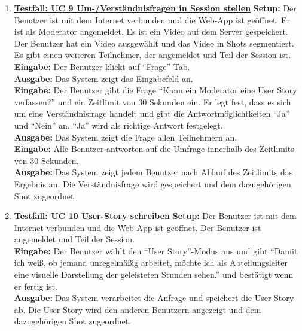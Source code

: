 \begin{enumerate}
	\item \underline{\textbf{Testfall: UC 9 Um-/Verständnisfragen in Session stellen}} \linebreak
	\textbf{Setup:} Der Benutzer ist mit dem Internet verbunden und die Web-App ist geöffnet. Er ist als Moderator angemeldet. Es ist ein Video auf dem Server gespeichert. Der Benutzer hat ein Video ausgewählt und das Video in Shots segmentiert. Es gibt einen weiteren Teilnehmer, der angemeldet und Teil der Session ist.\\
	\textbf{Eingabe:} Der Benutzer klickt auf ``Frage'' Tab. \\
	\textbf{Ausgabe:} Das System zeigt das Eingabefeld an.\\ 
	\textbf{Eingabe:} Der Benutzer gibt die Frage ``Kann ein Moderator eine User Story verfassen?'' und ein Zeitlimit von 30 Sekunden ein. Er legt fest, dass es sich um eine Verständnisfrage handelt und gibt die Antwortmöglichtkeiten ``Ja'' und ``Nein'' an. ``Ja'' wird als richtige Antwort festgelegt.\\
	\textbf{Ausgabe:} Das System zeigt die Frage allen Teilnehmern an.\\ 
	\textbf{Eingabe:} Alle Benutzer antworten auf die Umfrage innerhalb des Zeitlimits von 30 Sekunden. \\
	\textbf{Ausgabe:} Das System zeigt jedem Benutzer nach Ablauf des Zeitlimits das Ergebnis an. Die Verständnisfrage wird gespeichert und dem dazugehörigen Shot zugeordnet. \\
	
	\item \underline{\textbf{Testfall: UC 10 User-Story schreiben}} \linebreak
	\textbf{Setup:} Der Benutzer ist mit dem Internet verbunden und die Web-App ist geöffnet. Der Benutzer ist angemeldet und Teil der Session.\\
	\textbf{Eingabe:} Der Benutzer wählt den ``User Story''-Modus aus und gibt ``Damit ich weiß, ob jemand unregelmäßig arbeitet, möchte ich als Abteilungsleiter eine visuelle Darstellung der geleisteten Stunden sehen.'' und bestätigt wenn er fertig ist.\\
	\textbf{Ausgabe:} Das System verarbeitet die Anfrage und speichert die User Story ab. Die User Story wird den anderen Benutzern angezeigt und dem dazugehörigen Shot zugeordnet.\linebreak \linebreak
	

\end{enumerate}
